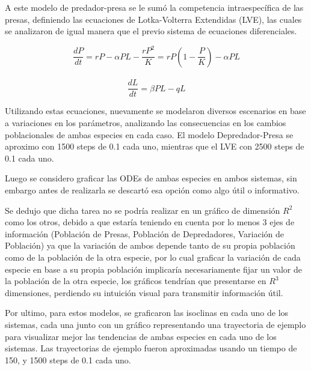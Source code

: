 \documentclass{article}
\begin{document}
\noindent A este modelo de predador-presa se le sumó la competencia intraespecífica de las presas, definiendo las ecuaciones de Lotka-Volterra Extendidas (LVE), las cuales se analizaron de igual manera que el previo sistema de ecuaciones diferenciales. \vspace{0.5\baselineskip}

\setlength{\baselineskip}{1\baselineskip}
\[\frac{dP}{dt} = rP - \alpha PL - \frac{rP^2}{K} = rP \left(1 - \frac{P}{K}\right) - \alpha PL \]\\
\[\frac{dL}{dt} = \beta PL - qL\]
\vspace{0.75\baselineskip}

\noindent Utilizando estas ecuaciones, nuevamente se modelaron diversos escenarios en base a variaciones en los parámetros, analizando las consecuencias en los cambios poblacionales de ambas especies en cada caso. El modelo Depredador-Presa se aproximo con 1500 steps de 0.1 cada uno, mientras que el LVE con 2500 steps de 0.1 cada uno. 
\vspace{1\baselineskip}

\noindent Luego se considero graficar las ODEs de ambas especies en ambos sistemas, sin embargo antes de realizarla se descartó esa opción como algo útil o informativo. \vspace{1\baselineskip}

\noindent Se dedujo que dicha tarea no se podría realizar en un gráfico de dimensión \( R^2 \) como los otros, debido a que estaría teniendo en cuenta por lo menos 3 ejes de información (Población de Presas, Población de Depredadores, Variación de Población) ya que la variación de ambos depende tanto de su propia población como de la población de la otra especie, por lo cual graficar la variación de cada especie en base a su propia población implicaría necesariamente fijar un valor de la población de la otra especie, los gráficos tendrían que presentarse en \( R^3 \) dimensiones, perdiendo su intuición visual para transmitir información útil. \vspace{1\baselineskip}

\noindent Por ultimo, para estos modelos, se graficaron las isoclinas en cada uno de los sistemas, cada una junto con un gráfico representando una trayectoria de ejemplo para visualizar mejor las tendencias de ambas especies en cada uno de los sistemas. Las trayectorias de ejemplo fueron aproximadas usando un tiempo de 150, y 1500 steps de 0.1 cada uno.
\end{document}
